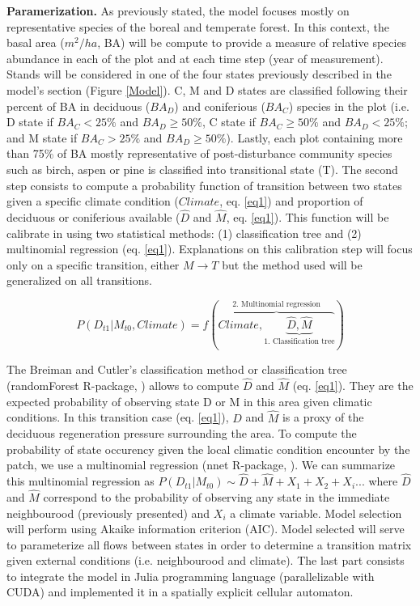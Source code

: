 \textbf{Paramerization.} As previously stated, the model focuses mostly on
representative species of the boreal and temperate forest. In this context,
the basal area ($m^2/ha$, BA) will be compute to provide a measure of relative
species abundance in each of the plot and at each time step (year of
measurement). Stands will be considered in one of the four states previously
described in the model's section (Figure \ref{Model}). C, M and D states are
classified following their percent of BA in deciduous ($BA_D$) and coniferious
($BA_C$) species in the plot (i.e. D state if $BA_C < 25\%$ and $BA_D \geq
50\%$, C state if ${BA}_C \geq 50\%$ and $BA_D < 25\%$; and M state if $BA_C >
25\%$ and $BA_D \geq 50\%$). Lastly, each plot containing more than 75\% of BA
mostly representative of post-disturbance community species such as birch,
aspen or pine is classified into transitional state (T). The second step
consists to compute a probability function of transition between two states
given a specific climate condition ($Climate$, eq. \ref{eq1}) and proportion
of deciduous or coniferious available ($\hat{D}$ and $\hat{M}$, eq.
\ref{eq1}). This function will be calibrate in using two statistical methods:
(1) classification tree and (2) multinomial regression (eq. \ref{eq1}).
Explanations on this calibration step will focus only on a specific
transition, either $M \rightarrow T$ but the method used will be generalized
on all transitions.

\vspace{-1em}
\begin{equation}
	P(D_{t1}|M_{t0}, Climate) = f(\overbrace{Climate, \underbrace{\hat{D}, \hat{M}}_\text{1. Classification tree}}^\text{2. Multinomial regression})
\label{eq1}
\end{equation}

The Breiman and Cutler's classification method or classification tree
(randomForest R-package, \cite{Liaw2002a}) allows to compute $\hat{D}$ and
$\hat{M}$ (eq. \ref{eq1}). They are the expected probability of observing
state D or M in this area given climatic conditions. In this transition case
(eq. \ref{eq1}), $\hat{D}$ and $\hat{M}$ is a proxy of the deciduous
regeneration pressure surrounding the area. To compute the probability of
state occurency given the local climatic condition encounter by the patch, we
use a multinomial regression (nnet R-package, \cite{Venables2002}). We can
summarize this multinomial regression as $P(D_{t1}|M_{t0}) \sim \hat{D} +
\hat{M} + X_1+X_2+X_i... $ where $\hat{D}$ and $\hat{M}$ correspond to the
probability of observing any state in the immediate neighbourood (previously
presented) and $X_i$ a climate variable. Model selection will perform using
Akaike information criterion (AIC). Model selected will serve to parameterize
all flows between states in order to determine a transition matrix given
external conditions (i.e. neighbourood and climate). The last part consists to
integrate the model in Julia programming language (parallelizable with CUDA)
and implemented it in a spatially explicit cellular automaton.\\

